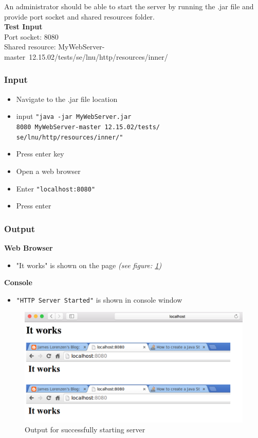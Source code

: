 \documentclass[a4paper, 12pt]{article}
\begin{document}
An administrator should be able to start the server by running the .jar file and provide port socket and shared resources folder.\\
\textbf{Test Input} \\ Port socket: 8080 \\ Shared resource: MyWebServer-master\ 12.15.02/tests/se/lnu/http/resources/inner/
\subsubsection{Input}
\begin{itemize}
\item Navigate to the .jar file location
\item input \texttt{"java -jar MyWebServer.jar \\
8080 MyWebServer-master\ 12.15.02/tests/\\se/lnu/http/resources/inner/"}
\item Press enter key
\item Open a web browser
\item Enter \texttt{"localhost:8080"}
\item Press enter
\end{itemize}

\subsubsection{Output}
\textbf{Web Browser}
\begin{itemize}
\item "It works" is shown on the page \textit{(see figure: \ref{TC1.1})}
\end{itemize}

\textbf{Console}
\begin{itemize}
\item \texttt{"HTTP Server Started"} is shown in console window
\end{itemize}

\begin{figure}[H]
\includegraphics[scale=0.5]{output_clarification/TC1-1.png} 
\caption{Output for successfully starting server}
\label{TC1.1}
\end{figure}
\end{document}
